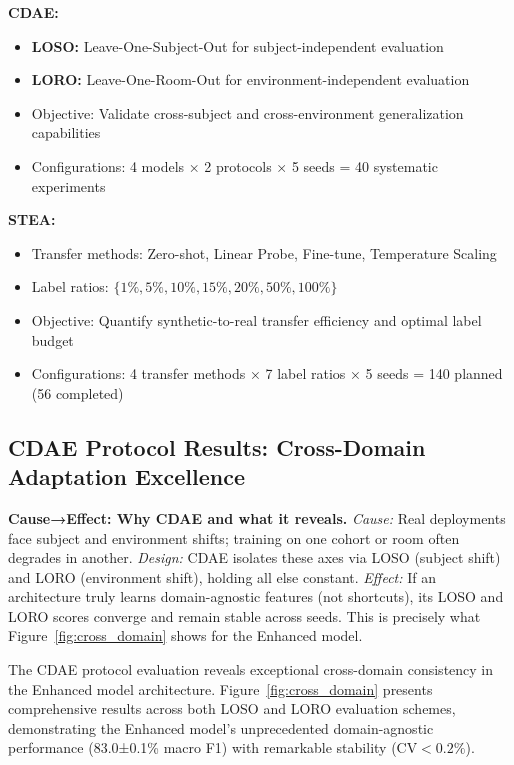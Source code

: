 \documentclass[journal]{IEEEtran}
\begin{document}

\textbf{CDAE:}
\begin{itemize}
\item \textbf{LOSO:} Leave-One-Subject-Out for subject-independent evaluation
\item \textbf{LORO:} Leave-One-Room-Out for environment-independent evaluation
\item Objective: Validate cross-subject and cross-environment generalization capabilities
\item Configurations: 4 models × 2 protocols × 5 seeds = 40 systematic experiments
\end{itemize}

\textbf{STEA:}
\begin{itemize}
\item Transfer methods: Zero-shot, Linear Probe, Fine-tune, Temperature Scaling
\item Label ratios: $\{1\%, 5\%, 10\%, 15\%, 20\%, 50\%, 100\%\}$
\item Objective: Quantify synthetic-to-real transfer efficiency and optimal label budget
\item Configurations: 4 transfer methods × 7 label ratios × 5 seeds = 140 planned (56 completed)
\end{itemize}

\subsection{CDAE Protocol Results: Cross-Domain Adaptation Excellence}

\textbf{Cause→Effect: Why CDAE and what it reveals.} \emph{Cause:} Real deployments face subject and environment shifts; training on one cohort or room often degrades in another. \emph{Design:} CDAE isolates these axes via LOSO (subject shift) and LORO (environment shift), holding all else constant. \emph{Effect:} If an architecture truly learns domain-agnostic features (not shortcuts), its LOSO and LORO scores converge and remain stable across seeds. This is precisely what Figure~\ref{fig:cross_domain} shows for the Enhanced model.

The CDAE protocol evaluation reveals exceptional cross-domain consistency in the Enhanced model architecture. Figure~\ref{fig:cross_domain} presents comprehensive results across both LOSO and LORO evaluation schemes, demonstrating the Enhanced model's unprecedented domain-agnostic performance (83.0±0.1\% macro F1) with remarkable stability ($\text{CV}<0.2\%$).
\end{document}
